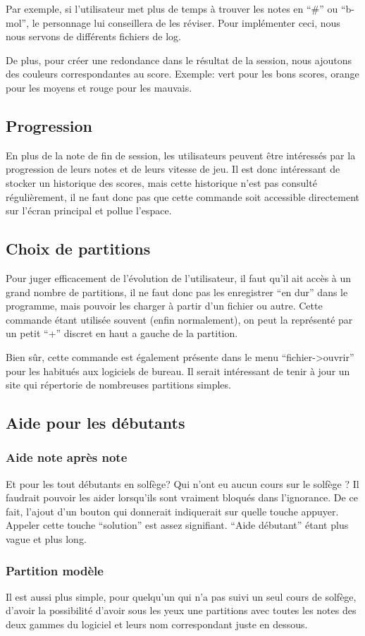 \documentclass{article}
\begin{document}
Par exemple, si l'utilisateur met plus de temps à trouver les notes en ``\#'' ou ``b-mol'', le personnage lui conseillera de les réviser.
Pour implémenter ceci, nous nous servons de différents fichiers de log.


De plus, pour créer une redondance dans le résultat de la session, nous ajoutons des couleurs correspondantes au score. Exemple: vert pour les bons scores,
orange pour les moyens et rouge pour les mauvais.
\subsection{Progression}
En plus de la note de fin de session, les utilisateurs peuvent être intéressés par la progression de leurs notes et de leurs vitesse
de jeu. Il est donc intéressant de stocker un historique des scores, mais cette historique n'est pas consulté régulièrement, il ne 
faut donc pas que cette commande soit accessible directement sur l'écran principal et pollue l'espace.
\subsection{Choix de partitions}
Pour juger efficacement de l'évolution de l'utilisateur, il faut qu'il ait accès à un grand nombre de partitions, il ne faut donc 
pas les enregistrer ``en dur'' dans le programme, mais pouvoir les charger à partir d'un fichier ou autre. Cette commande étant utilisée
 souvent (enfin normalement), on peut la représenté par un petit ``+'' discret en haut a gauche de la partition.
 
 
 Bien sûr, cette commande est également présente dans le menu ``fichier->ouvrir'' pour les habitués aux logiciels de bureau.
 Il serait intéressant de tenir à jour un site qui répertorie de nombreuses partitions simples.
\subsection{Aide pour les débutants}
\subsubsection{Aide note après note}
Et pour les tout débutants en solfège? Qui n'ont eu aucun cours sur le solfège ? Il faudrait pouvoir les aider lorsqu'ils sont 
vraiment bloqués dans l'ignorance. De ce fait, l'ajout d'un bouton qui donnerait indiquerait sur quelle touche appuyer.
Appeler cette touche ``solution'' est assez signifiant. ``Aide débutant'' étant plus vague et plus long.
\subsubsection{Partition modèle}
Il est aussi plus simple, pour quelqu'un qui n'a pas suivi un seul cours de solfège, d'avoir la possibilité d'avoir sous les yeux une
partitions avec toutes les notes des deux gammes du logiciel et leurs nom correspondant juste en dessous.
\end{document}
